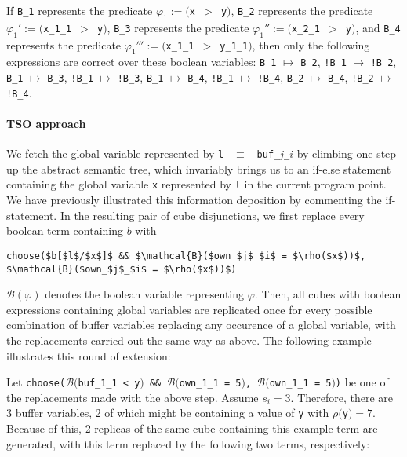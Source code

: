 If \lstinline$B_1$ represents the predicate $\varphi_1 := ($\lstinline$x $$>$\lstinline$ y$$)$, \lstinline$B_2$ represents the predicate $\varphi_1' := ($\lstinline$x_1_1 $$>$\lstinline$ y$$)$, \lstinline$B_3$ represents the predicate $\varphi_1'' := ($\lstinline$x_2_1 $$>$\lstinline$ y$$)$, and \lstinline$B_4$ represents the predicate $\varphi_1''' := ($\lstinline$x_1_1 $$>$\lstinline$ y_1_1$$)$, then only the following expressions are correct over these boolean variables: \lstinline$B_1$ $\mapsto$ \lstinline$B_2$, \lstinline$!B_1$ $\mapsto$ \lstinline$!B_2$, \lstinline$B_1$ $\mapsto$ \lstinline$B_3$, \lstinline$!B_1$ $\mapsto$ \lstinline$!B_3$, \lstinline$B_1$ $\mapsto$ \lstinline$B_4$, \lstinline$!B_1$ $\mapsto$ \lstinline$!B_4$, \lstinline$B_2$ $\mapsto$ \lstinline$B_4$, \lstinline$!B_2$ $\mapsto$ \lstinline$!B_4$.

\paragraph{TSO approach}

We fetch the global variable represented by \lstinline$l $ $\equiv$ \lstinline$ buf_$$j$\lstinline$_$$i$ by climbing one step up the abstract semantic tree, which invariably brings us to an if-else statement containing the global variable \lstinline$x$ represented by \lstinline$l$ in the current program point. We have previously illustrated this information deposition by commenting the if-statement.
In the resulting pair of cube disjunctions, we first replace every boolean term containing $b$ with 
\begin{lstlisting}[frame=single, mathescape]
choose($b[$l$/$x$]$ && $\mathcal{B}($own_$j$_$i$ = $\rho($x$))$, $\mathcal{B}($own_$j$_$i$ = $\rho($x$))$)
\end{lstlisting}

$\mathcal{B}(\varphi)$ denotes the boolean variable representing $\varphi$. Then, all cubes with boolean expressions containing global variables are replicated once for every possible combination of buffer variables replacing any occurence of a global variable, with the replacements carried out the same way as above. The following example illustrates this round of extension:\\

\pagebreak

Let \lstinline$choose($$\mathcal{B}($\lstinline$buf_1_1 < y$$)$\lstinline$ && $$\mathcal{B}($\lstinline$own_1_1 = 5$$)$\lstinline$, $$\mathcal{B}($\lstinline$own_1_1 = 5$$)$\lstinline$)$ be one of the replacements made with the above step. Assume $s_{i} = 3$. Therefore, there are 3 buffer variables, 2 of which might be containing a value of \lstinline$y$ with $\rho($\lstinline$y$$) = 7$. Because of this, 2 replicas of the same cube containing this example term are generated, with this term replaced by the following two terms, respectively:


